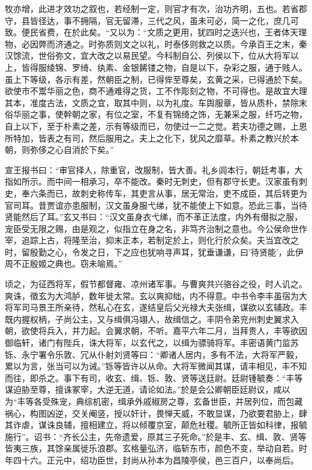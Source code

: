 \documentclass[12pt,UTF8]{ctexbook}
\begin{document}
牧亦增，此进才效功之叙也，若经制一定，则官才有次，治功齐明，五也。若省郡守，县皆径达，事不拥隔，官无留滞，三代之风，虽未可必，简一之化，庶几可致。便民省费，在於此矣。“又以为：“文质之更用，犹四时之迭兴也，王者体天理物，必因弊而济通之。时弥质则文之以礼，时泰侈则救之以质。今承百王之末，秦汉馀流，世俗弥文，宜大改之以易民望。今科制自公、列侯以下，位从大将军以上，皆得服绫锦、罗绮、纨素、金银餙镂之物，自是以下，杂彩之服，通于贱人。虽上下等级，各示有差，然朝臣之制，已得侔至尊矣，玄黄之采，已得通於下矣。欲使市不鬻华丽之色，商不通难得之货，工不作彫刻之物，不可得也。是故宜大理其本，准度古法，文质之宜，取其中则，以为礼度。车舆服章，皆从质朴，禁除末俗华丽之事，使幹朝之家，有位之室，不复有锦绮之饰，无兼采之服，纤巧之物，自上以下，至于朴素之差，示有等级而已，勿使过一二之觉。若夫功德之赐，上恩所特加，皆表之有司，然后服用之。夫上之化下，犹风之靡草。朴素之教兴於本朝，则弥侈之心自消於下矣。”

宣王报书曰：“审官择人，除重官，改服制，皆大善。礼乡闾本行，朝廷考事，大指如所示。而中间一相承习，卒不能改。秦时无刺史，但有郡守长吏。汉家虽有刺史，奉六条而已，故刺史称传车，其吏言从事，居无常治，吏不成臣，其后转更为官司耳。昔贾谊亦患服制，汉文虽身服弋绨，犹不能使上下如意。恐此三事，当待贤能然后了耳。”玄又书曰：“汉文虽身衣弋绨，而不革正法度，内外有僣拟之服，宠臣受无限之赐，由是观之，似指立在身之名，非笃齐治制之意也。今公侯命世作宰，追踪上古，将隆至治，抑末正本，若制定於上，则化行於众矣。夫当宜改之时，留殷勤之心，令发之日，下之应也犹响寻声耳，犹垂谦谦，曰'待贤能'，此伊周不正殷姬之典也。窃未喻焉。”

顷之，为征西将军，假节都督雍、凉州诸军事。与曹爽共兴骆谷之役，时人讥之。爽诛，徵玄为大鸿胪，数年徙太常。玄以爽抑绌，内不得意。中书令李丰虽宿为大将军司马景王所亲待，然私心在玄，遂结皇后父光禄大夫张缉，谋欲以玄辅政。丰既内握权柄，子尚公主，又与缉俱冯翊人，故缉信之。丰阴令弟兖州刺史翼求入朝，欲使将兵入，并力起。会翼求朝，不听。嘉平六年二月，当拜贵人，丰等欲因御临轩，诸门有陛兵，诛大将军，以玄代之，以缉为骠骑将军。丰密语黄门监苏铄、永宁署令乐敦、冗从仆射刘贤等曰：“卿诸人居内，多有不法，大将军严毅，累以为言，张当可以为诫。”铄等皆许以从命。大将军微闻其谋，请丰相见，丰不知而往，即杀之。事下有司，收玄、缉、铄、敦、贤等送廷尉。廷尉锺毓奏：“丰等谋迫胁至尊，擅诛冢宰，大逆无道，请论如法。”於是会公卿朝臣廷尉议，咸以为“丰等各受殊宠，典综机密，缉承外戚椒房之尊，玄备世臣，并居列位，而包藏祸心，构图凶逆，交关阉竖，授以奸计，畏惮天威，不敢显谋，乃欲要君胁上，肆其诈虐，谋诛良辅，擅相建立，将以倾覆京室，颠危社稷。毓所正皆如科律，报毓施行”。诏书：“齐长公主，先帝遗爱，原其三子死命。”於是丰、玄、缉、敦、贤等皆夷三族，其馀亲属徙乐浪郡。玄格量弘济，临斩东巿，颜色不变，举动自若。时年四十六。正元中，绍功臣世，封尚从孙本为昌陵亭侯，邑三百户，以奉尚后。
\end{document}
